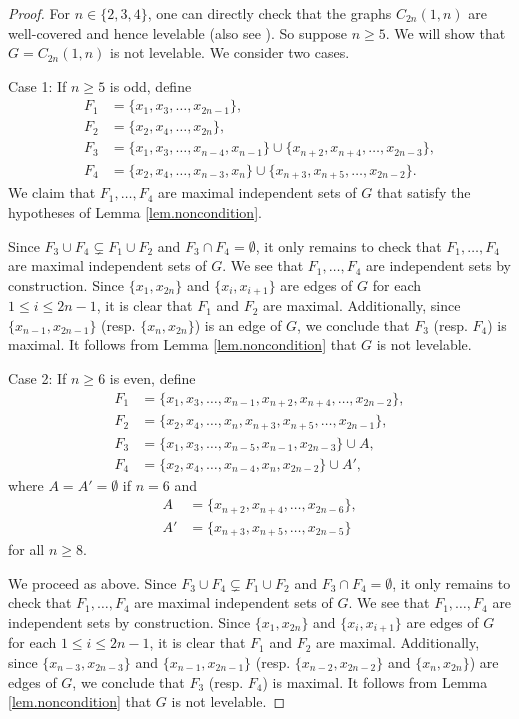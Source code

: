 \documentclass[12pt]{amsart}
\numberwithin{equation}{section}
\theoremstyle{definition}
\newcounter{i} %
\begin{document}
\begin{proof}
   For $n \in \{2,3,4\}$, one can directly check that the graphs $C_{2n}(1,n)$ are well-covered and hence levelable (also 
   see \cite[Theorem 4.3]{BH2011}). So suppose $n\geq 5$. We will show that $G=C_{2n}(1,n)$ is not levelable. We consider two cases.

    Case 1: If $n\geq 5$ is odd, define
    \begin{align*}
        F_1 &= \{ x_1,x_3,\dots,x_{2n-1} \}, \\
        F_2 &= \{ x_2,x_4,\dots,x_{2n} \}, \\
        F_3 &= \{ x_1,x_3,\dots,x_{n-4},x_{n-1}\} \cup \{x_{n+2},x_{n+4} ,\dots, x_{2n-3}\}, \\
        F_4 &= \{x_2,x_4,\dots,x_{n-3},x_{n}\} \cup \{x_{n+3},x_{n+5} ,\dots, x_{2n-2}\}.
    \end{align*}
    We claim that $F_1,\dots,F_4$ are maximal independent sets of $G$ that satisfy the hypotheses of Lemma \ref{lem.noncondition}.

    Since $F_3 \cup F_4 \subsetneq F_1 \cup F_2$ and $F_3 \cap F_4= \emptyset$, it only remains to check that $F_1,\dots,F_4$ are maximal independent sets of $G$. We see that $F_1,\dots, F_4$ are independent sets by construction.
    Since $\{x_1,x_{2n}\}$ and $\{x_i,x_{i+1}\}$ are edges of $G$ for each $1 \leq i \leq 2n-1$, it is clear that $F_1$ and $F_2$ are maximal. Additionally, since $\{x_{n-1},x_{2n-1}\}$ (resp. $\{x_{n},x_{2n}\}$) is an edge of $G$, we conclude that $F_3$ (resp. $F_4$) is maximal. It follows from Lemma \ref{lem.noncondition} that $G$ is not levelable.

    Case 2: If $n \geq 6$ is even, define
    \begin{align*}
        F_1 &= \{ x_1,x_3,\dots,x_{n-1}, x_{n+2}, x_{n+4},\dots, x_{2n-2} \}, \\
        F_2 &= \{ x_2,x_4,\dots,x_{n}, x_{n+3}, x_{n+5},\dots, x_{2n-1}\}, \\
        F_3 &= \{x_1,x_3,\dots,x_{n-5},x_{n-1}, x_{2n-3}\} \cup A, \\
        F_4 &= \{x_2,x_4,\dots,x_{n-4},x_{n},x_{2n-2}\} \cup A',
    \end{align*}
    where $A=A'=\emptyset$ if $n=6$ and \begin{align*}
        A &=\{x_{n+2},x_{n+4},\dots,x_{2n-6}\}, \\
        A' &=\{x_{n+3},x_{n+5},\dots,x_{2n-5}\}
        \end{align*}
    for all $n\geq 8$.
   
    We proceed as above. Since $F_3 \cup F_4 \subsetneq F_1 \cup F_2$ and $F_3 \cap F_4 = \emptyset$, it only remains to check that $F_1,\dots,F_4$ are maximal independent sets of $G$. We see that $F_1,\dots, F_4$ are independent sets by construction. Since $\{x_1,x_{2n}\}$ and $\{x_i,x_{i+1}\}$ are edges of $G$ for each $1 \leq i \leq 2n-1$, it is clear that $F_1$ and $F_2$ are maximal. Additionally, since $\{x_{n-3},x_{2n-3}\}$ and $\{x_{n-1},x_{2n-1}\}$ (resp. $\{x_{n-2},x_{2n-2}\}$ and $\{x_{n},x_{2n}\}$) are edges of $G$, we conclude that $F_3$ (resp. $F_4$) is maximal. It follows from Lemma \ref{lem.noncondition} that $G$ is not levelable.
\end{proof}
\end{document}
